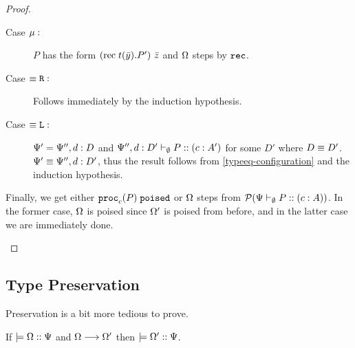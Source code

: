 \begin{proof}
\begin{itemize}
\begin{description}
      \item[Case $\mu :$] $P$ has the form ${(\mathrm{rec}\; {t}(\bar{y}) . {P}')}~{\bar{z}}$ and $\Omega$ steps by $\texttt{rec}$.

      \item[Case $\equiv\texttt{R} :$] Follows immediately by the induction hypothesis.
      \item[Case $\equiv\texttt{L} :$] $\Psi' = \Psi'', d : D$ and ${\Psi'', d : D'} \vdash_{\emptyset} P :: (c : A')$ for some $D'$ where $D \equiv D'$. $\Psi' \equiv \Psi'', d : D'$, thus the result follows from \cref{typeeq-configuration} and the induction hypothesis.
    \end{description}

    Finally, we get either $\mathtt{proc}_{c}(P)\;\mathtt{poised}$ or $\Omega$ steps from $\pred{\typeRecD \ctx \emptyset P c A}$. In the former case, $\Omega$ is poised since $\Omega'$ is poised from before, and in the latter case we are immediately done.
\end{itemize}
\end{proof}

\subsection{Type Preservation}

Preservation is a bit more tedious to prove.

\begin{theorem}[Preservation]
\label{base:preservation}
If $\models {\Omega} :: {\Psi}$ and $\Omega \longrightarrow \Omega'$ then $\models {\Omega'} :: {\Psi}$.
\end{theorem}

